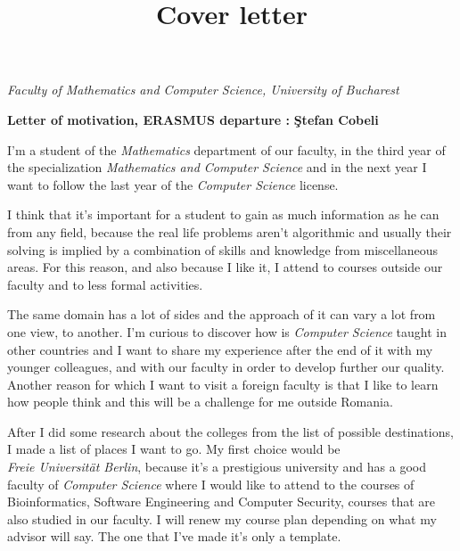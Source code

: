 \documentclass[22]{letter}
\date{\vspace{-5ex}}
\title{Cover letter}
\begin{document}

\begin{letter}{  } %


\opening{\textit{ Faculty of Mathematics and Computer Science, University of Bucharest\\} }


\vspace{2\parskip}
\vspace{2\parskip}
\textbf{Letter of motivation, ERASMUS departure : } \textbf{\c Stefan Cobeli}
\vspace{2\parskip} %
\vspace{2\parskip} %

I'm a student of the\textit{ Mathematics} department of our faculty, in the third year of the specialization \textit{Mathematics and Computer Science}  and in the next year I want to follow the last year of the \textit{Computer Science} license. 


I think that it's important for a student to gain as much information as he can from any field, because the real life problems aren't algorithmic and usually their solving is implied by a combination of  skills and knowledge from miscellaneous areas. For this reason, and  also because I like it, I attend to courses outside our faculty and to less formal activities.

The same domain has a lot of sides and the approach of it can vary a lot from one view, to another. I'm curious to discover how is\textit{ Computer Science} taught in other countries and I want to share my experience after the end of it with my younger colleagues, and with our faculty in order to develop further our quality.
Another reason for which I want to visit a foreign faculty is that I like to learn how people think and this will be a challenge for me outside Romania.

After I did some research about the colleges from the list of possible destinations, I made a list of places I want to go. My first choice would be\\ \textit{Freie Universit\" at Berlin}, because it's a prestigious university and has a good faculty of \textit{Computer Science} where I would like to attend to the courses of Bioinformatics, Software Engineering and Computer Security, courses that are also studied in our faculty. I will renew my course plan depending on what my advisor will say. The one that I've made it's only a template.


\end{letter}
\end{document}
